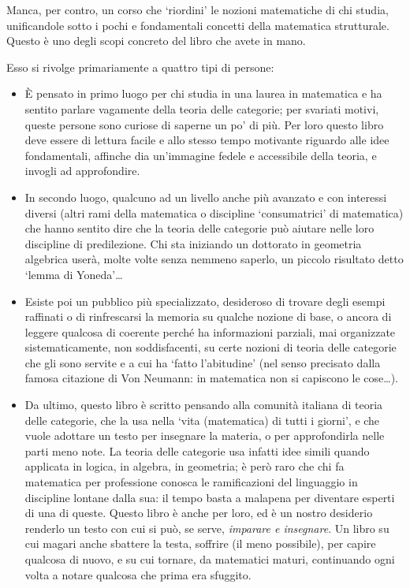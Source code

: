 Manca, per contro, un corso che `riordini' le nozioni matematiche di chi studia, unificandole sotto i pochi e fondamentali concetti della matematica strutturale. Questo è uno degli scopi concreto del libro che avete in mano.

Esso si rivolge primariamente a quattro tipi di persone:
\begin{itemize}
	\item \`E pensato in primo luogo per chi studia in una laurea in matematica e ha sentito parlare vagamente della teoria delle categorie; per svariati motivi, queste persone sono curiose di saperne un po' di più. Per loro questo libro deve essere di lettura facile e allo stesso tempo motivante riguardo alle idee fondamentali, affinche dia un'immagine fedele e accessibile della teoria, e invogli ad approfondire.
	\item In secondo luogo, qualcuno ad un livello anche più avanzato e con interessi diversi (altri rami della matematica o discipline `consumatrici' di matematica) che hanno sentito dire che la teoria delle categorie pu\`o aiutare nelle loro discipline di predilezione. Chi sta iniziando un dottorato in geometria algebrica userà, molte volte senza nemmeno saperlo, un piccolo risultato detto `lemma di Yoneda'\dots
	\item Esiste poi un pubblico pi\`u specializzato, desideroso di trovare degli esempi raffinati o di rinfrescarsi la memoria su qualche nozione di base, o ancora di leggere qualcosa di coerente perché ha informazioni parziali, mai organizzate sistematicamente, non soddisfacenti, su certe nozioni di teoria delle categorie che gli sono servite e a cui ha `fatto l'abitudine' (nel senso precisato dalla famosa citazione di Von Neumann: in matematica non si capiscono le cose\dots).
	\item Da ultimo, questo libro è scritto pensando alla comunità italiana di teoria delle categorie, che la usa nella `vita (matematica) di tutti i giorni', e che vuole adottare un testo per insegnare la materia, o per approfondirla nelle parti meno note. La teoria delle categorie usa infatti idee simili quando applicata in logica, in algebra, in geometria; è però raro che chi fa matematica per professione conosca le ramificazioni del linguaggio in discipline lontane dalla sua: il tempo basta a malapena per diventare esperti di una di queste. Questo libro è anche per loro, ed è un nostro desiderio renderlo un testo con cui si può, se serve, \emph{imparare e insegnare}. Un libro su cui magari anche sbattere la testa, soffrire (il meno possibile), per capire qualcosa di nuovo, e su cui tornare, da matematici maturi, continuando ogni volta a notare qualcosa che prima era sfuggito.
\end{itemize}
\Todo{}


